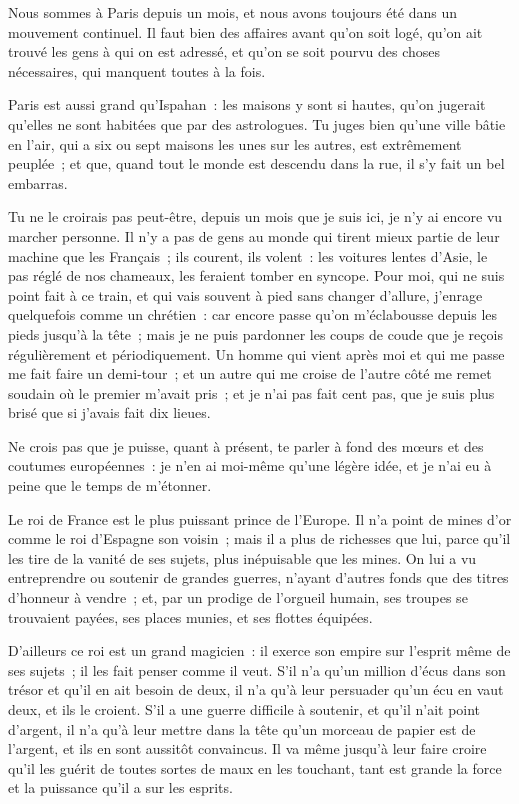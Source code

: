 \documentclass[french,twoside]{book} %
\begin{document}
\noindent Nous sommes à Paris depuis un mois, et nous avons toujours été dans un mouvement continuel. Il faut bien des affaires avant qu’on soit logé, qu’on ait trouvé les gens à qui on est adressé, et qu’on se soit pourvu des choses nécessaires, qui manquent toutes à la fois.\par
Paris est aussi grand qu’Ispahan : les maisons y sont si hautes, qu’on jugerait qu’elles ne sont habitées que par des astrologues. Tu juges bien qu’une ville bâtie en l’air, qui a six ou sept maisons les unes sur les autres, est extrêmement peuplée ; et que, quand tout le monde est descendu dans la rue, il s’y fait un bel embarras.\par
Tu ne le croirais pas peut-être, depuis un mois que je suis ici, je n’y ai encore vu marcher personne. Il n’y a pas de gens au monde qui tirent mieux partie de leur machine que les Français ; ils courent, ils volent : les voitures lentes d’Asie, le pas réglé de nos chameaux, les feraient tomber en syncope. Pour moi, qui ne suis point fait à ce train, et qui vais souvent à pied sans changer d’allure, j’enrage quelquefois comme un chrétien : car encore passe qu’on m’éclabousse depuis les pieds jusqu’à la tête ; mais je ne puis pardonner les coups de coude que je reçois régulièrement et périodiquement. Un homme qui vient après moi et qui me passe me fait faire un demi-tour ; et un autre qui me croise de l’autre côté me remet soudain où le premier m’avait pris ; et je n’ai pas fait cent pas, que je suis plus brisé que si j’avais fait dix lieues.\par
Ne crois pas que je puisse, quant à présent, te parler à fond des mœurs et des coutumes européennes : je n’en ai moi-même qu’une légère idée, et je n’ai eu à peine que le temps de m’étonner.\par
Le roi de France est le plus puissant prince de l’Europe. Il n’a point de mines d’or comme le roi d’Espagne son voisin ; mais il a plus de richesses que lui, parce qu’il les tire de la vanité de ses sujets, plus inépuisable que les mines. On lui a vu entreprendre ou soutenir de grandes guerres, n’ayant d’autres fonds que des titres d’honneur à vendre ; et, par un prodige de l’orgueil humain, ses troupes se trouvaient payées, ses places munies, et ses flottes équipées.\par
D’ailleurs ce roi est un grand magicien : il exerce son empire sur l’esprit même de ses sujets ; il les fait penser comme il veut. S’il n’a qu’un million d’écus dans son trésor et qu’il en ait besoin de deux, il n’a qu’à leur persuader qu’un écu en vaut deux, et ils le croient. S’il a une guerre difficile à soutenir, et qu’il n’ait point d’argent, il n’a qu’à leur mettre dans la tête qu’un morceau de papier est de l’argent, et ils en sont aussitôt convaincus. Il va même jusqu’à leur faire croire qu’il les guérit de toutes sortes de maux en les touchant, tant est grande la force et la puissance qu’il a sur les esprits.\par
\end{document}
